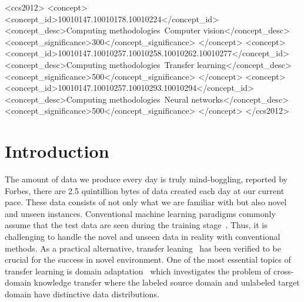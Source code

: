 \documentclass[sigconf]{acmart}
\begin{document}
\begin{CCSXML}
<ccs2012>
<concept>
<concept_id>10010147.10010178.10010224</concept_id>
<concept_desc>Computing methodologies~Computer vision</concept_desc>
<concept_significance>300</concept_significance>
</concept>
<concept>
<concept_id>10010147.10010257.10010258.10010262.10010277</concept_id>
<concept_desc>Computing methodologies~Transfer learning</concept_desc>
<concept_significance>500</concept_significance>
</concept>
<concept>
<concept_id>10010147.10010257.10010293.10010294</concept_id>
<concept_desc>Computing methodologies~Neural networks</concept_desc>
<concept_significance>500</concept_significance>
</concept>
</ccs2012>
\end{CCSXML}






\maketitle

\section{Introduction}
The amount of data we produce every day is truly mind-boggling, reported by Forbes, there are 2.5 quintillion bytes of data created each day at our current pace. These data consists of not only what we are familiar with but also novel and unseen instances. Conventional machine learning paradigms commonly assume that the test data are seen during the training stage~\cite{xian2017zero,li2019zero,Li_2019_CVPR}. Thus, it is challenging to handle the novel and unseen data in reality with conventional methods. As a practical alternative, transfer leaning~\cite{pan2010survey,li2018transfer,li2019locality} has been verified to be crucial for the success in novel environment. One of the most essential topics of transfer learning is domain adaptation~\cite{pan2011domain,tzeng2014deep,long2018conditional,tzeng2017adversarial,ding2018semi} which investigates the problem of cross-domain knowledge transfer where the labeled source domain and unlabeled target domain have distinctive data distributions.
\end{document}
